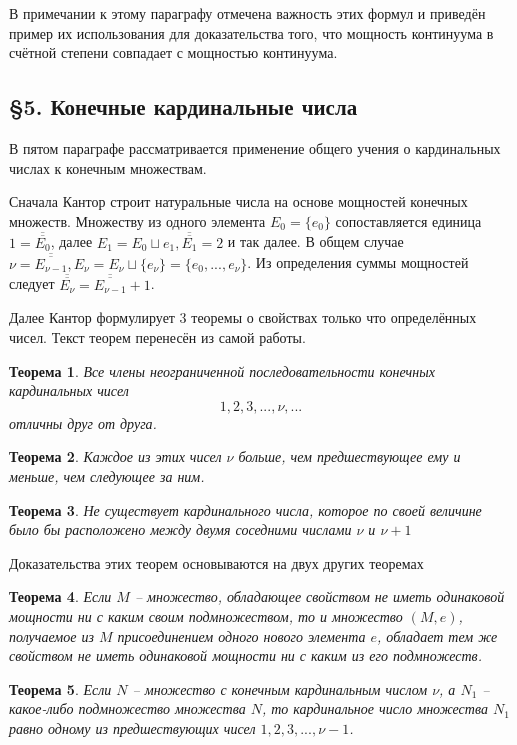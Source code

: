 \documentclass[a4paper,12pt]{extarticle}
\newtheorem{theorem}{Теорема}[subsection]
\theoremstyle{definition}
\newcommand{\car}[1]{\overline{\overline{#1}}}
\begin{document}
В примечании к этому параграфу отмечена важность этих формул и приведён пример их использования для доказательства того,
что мощность континуума в счётной степени совпадает с мощностью континуума.

\subsection{\S 5. Конечные кардинальные числа}
В пятом параграфе рассматривается применение общего учения о кардинальных числах к конечным множествам.

Сначала Кантор строит натуральные числа на основе мощностей конечных множеств.
Множеству из одного элемента $E_0 = \{e_0\}$ сопоставляется единица $1 = \car{E_0}$, далее $E_1 = E_0 \sqcup {e_1}, \car{E_1} = 2$ и так далее.
В общем случае $\nu = \car{E_{\nu - 1}}, E_{\nu} = E_{\nu} \sqcup \{e_{\nu}\} = \{e_0, ..., e_{\nu}\}$.
Из определения суммы мощностей следует $\car{E_{\nu}} = \car{E_{\nu-1}} + 1$.

Далее Кантор формулирует 3 теоремы о свойствах только что определённых чисел.
Текст теорем перенесён из самой работы.
\begin{theorem}
\label{A}
Все члены неограниченной последовательности конечных кардинальных чисел $$1, 2, 3, ..., \nu,...$$ отличны друг от друга.
\end{theorem}
\begin{theorem}
\label{B}
Каждое из этих чисел $\nu$ больше, чем предшествующее ему и меньше, чем следующее за ним.
\end{theorem}
\begin{theorem}
\label{C}
Не существует кардинального числа, которое по своей величине было бы расположено между двумя соседними числами $\nu$ и $\nu + 1$
\end{theorem}
Доказательства этих теорем основываются на двух других теоремах
\begin{theorem}
\label{D}
Если $M$ -- множество, обладающее свойством не иметь одинаковой мощности ни с каким своим подмножеством, то и множество $(M, e)$,
получаемое из $M$ присоединением  одного нового элемента $e$, обладает тем же свойством не иметь одинаковой мощности ни с каким из его подмножеств.
\end{theorem}
\begin{theorem}
\label{E}
Если $N$ -- множество с конечным кардинальным числом $\nu$, а $N_1$ -- какое-либо подмножество множества $N$, то кардинальное число множества $N_1$ равно одному из предшествующих чисел $1, 2, 3, ..., \nu - 1$.
\end{theorem}
\end{document}
